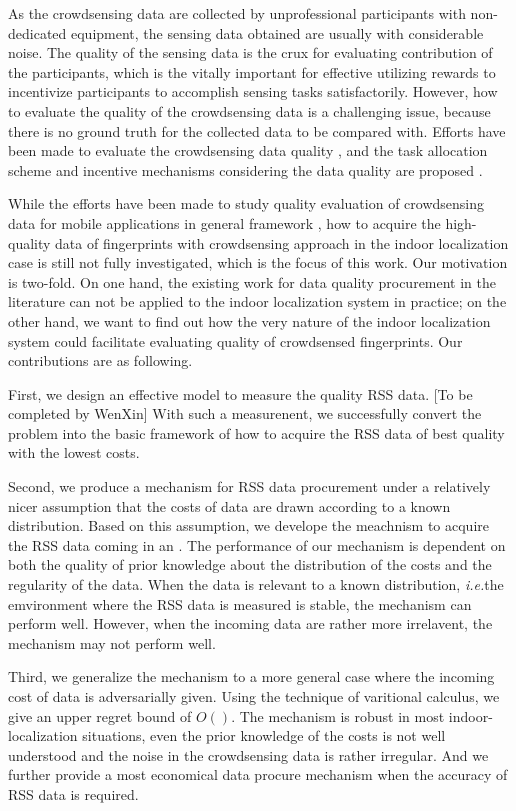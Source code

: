 \documentclass[10pt,conference,compsocconf,letterpaper]{IEEEtran}
\newcommand{\ie}{{\em i.e.}}
\begin{document}
As the crowdsensing data are collected by unprofessional participants with non-dedicated equipment, the sensing data obtained are usually with considerable noise. The quality of the sensing data is the crux for evaluating contribution of the participants, which is the vitally important for effective utilizing rewards to incentivize participants to accomplish sensing tasks satisfactorily. However, how to evaluate the quality of the crowdsensing data is a challenging issue, because there is no ground truth for the collected data to be compared with. Efforts have been made to evaluate the crowdsensing data quality \cite{ Lbs2, Crowdloc14}, and the task allocation scheme \cite{ Taskselection15, recruit} and incentive mechanisms considering the data quality are proposed \cite{ Pengdan15, noise, incentive, Incentive2}. 

While the efforts have been made to study quality evaluation of crowdsensing data for mobile applications in general framework \cite{}, how to acquire the high-quality data of fingerprints with crowdsensing approach in the indoor localization case is still not fully investigated, which is the focus of this work. Our motivation is two-fold. On one hand, the existing work for data quality procurement in the literature \cite{} can not be applied to the indoor localization system in practice; on the other hand, we want to find out how the very nature of the indoor localization system could facilitate evaluating quality of crowdsensed fingerprints. Our contributions are as following.

First, we design an effective model to measure the quality RSS data.
[To be completed by WenXin] With such a measurenent, we successfully convert the problem into the basic framework of how to acquire the RSS data of best quality with the lowest costs.

Second, we produce a mechanism for RSS data procurement under a relatively nicer assumption that the costs of data are drawn according to a known distribution. Based on this assumption, we develope the meachnism to acquire the RSS data coming in an . The performance of our mechanism is dependent on both the quality of prior knowledge about the distribution of the costs and the regularity of the data. When the data is relevant to a known distribution, \ie the emvironment where the RSS data is measured is stable, the mechanism can perform well. However, when the incoming data are rather more irrelavent, the mechanism may not perform well.

Third, we generalize the mechanism to a more general case where the incoming cost of data is adversarially given. Using the technique of varitional calculus, we give an upper regret bound of $O()$. The mechanism is robust in most indoor-localization situations, even the prior knowledge of the costs is not well understood and the noise in the crowdsensing data is rather irregular. And we further provide a most economical data procure mechanism when the accuracy of RSS data is required.
\end{document}
